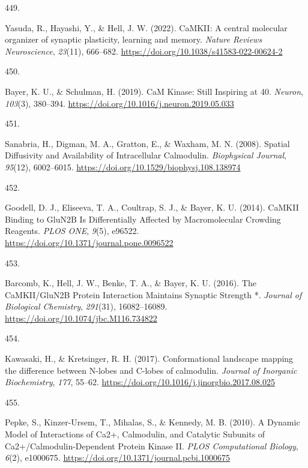 \documentclass[
  11pt,
  letterpaper,
]{scrreprt}
\newlength{\cslhangindent}
\newlength{\csllabelwidth}
\newenvironment{CSLReferences}[2] %
 {\begin{list}{}{%
  \setlength{\itemindent}{0pt}
  \setlength{\leftmargin}{0pt}
  \setlength{\parsep}{0pt}
  \ifodd #1
   \setlength{\leftmargin}{\cslhangindent}
   \setlength{\itemindent}{-1\cslhangindent}
  \fi
  \setlength{\itemsep}{#2\baselineskip}}}
 {\end{list}}
\newcommand{\CSLLeftMargin}[1]{\parbox[t]{\csllabelwidth}{\strut#1\strut}}
\newcommand{\CSLRightInline}[1]{\parbox[t]{\linewidth - \csllabelwidth}{\strut#1\strut}}
\begin{document}
\begin{CSLReferences}{0}{0}
\CSLLeftMargin{449. }%
\CSLRightInline{Yasuda, R., Hayashi, Y., \& Hell, J. W. (2022).
{CaMKII}: A central molecular organizer of synaptic plasticity, learning
and memory. \emph{Nature Reviews Neuroscience}, \emph{23}(11), 666--682.
\url{https://doi.org/10.1038/s41583-022-00624-2}}

\CSLLeftMargin{450. }%
\CSLRightInline{Bayer, K. U., \& Schulman, H. (2019). {CaM Kinase}:
{Still Inspiring} at 40. \emph{Neuron}, \emph{103}(3), 380--394.
\url{https://doi.org/10.1016/j.neuron.2019.05.033}}

\CSLLeftMargin{451. }%
\CSLRightInline{Sanabria, H., Digman, M. A., Gratton, E., \& Waxham, M.
N. (2008). Spatial {Diffusivity} and {Availability} of {Intracellular
Calmodulin}. \emph{Biophysical Journal}, \emph{95}(12), 6002--6015.
\url{https://doi.org/10.1529/biophysj.108.138974}}

\CSLLeftMargin{452. }%
\CSLRightInline{Goodell, D. J., Eliseeva, T. A., Coultrap, S. J., \&
Bayer, K. U. (2014). {CaMKII Binding} to {GluN2B Is Differentially
Affected} by {Macromolecular Crowding Reagents}. \emph{PLOS ONE},
\emph{9}(5), e96522. \url{https://doi.org/10.1371/journal.pone.0096522}}

\CSLLeftMargin{453. }%
\CSLRightInline{Barcomb, K., Hell, J. W., Benke, T. A., \& Bayer, K. U.
(2016). The {CaMKII}/{GluN2B Protein Interaction Maintains Synaptic
Strength} *. \emph{Journal of Biological Chemistry}, \emph{291}(31),
16082--16089. \url{https://doi.org/10.1074/jbc.M116.734822}}

\CSLLeftMargin{454. }%
\CSLRightInline{Kawasaki, H., \& Kretsinger, R. H. (2017).
Conformational landscape mapping the difference between {N-lobes} and
{C-lobes} of calmodulin. \emph{Journal of Inorganic Biochemistry},
\emph{177}, 55--62.
\url{https://doi.org/10.1016/j.jinorgbio.2017.08.025}}

\CSLLeftMargin{455. }%
\CSLRightInline{Pepke, S., Kinzer-Ursem, T., Mihalas, S., \& Kennedy, M.
B. (2010). A {Dynamic Model} of {Interactions} of {Ca2}+, {Calmodulin},
and {Catalytic Subunits} of {Ca2}+/{Calmodulin-Dependent Protein Kinase
II}. \emph{PLOS Computational Biology}, \emph{6}(2), e1000675.
\url{https://doi.org/10.1371/journal.pcbi.1000675}}


\end{CSLReferences}
\end{document}
